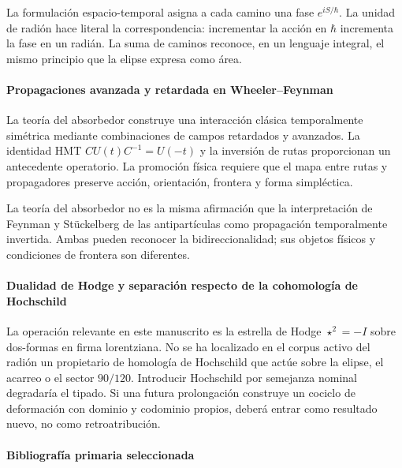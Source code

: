 La formulación espacio-temporal asigna a cada camino una fase
\(e^{iS/\hbar}\). La unidad de radión hace literal la correspondencia:
incrementar la acción en \(\hbar\) incrementa la fase en un radián. La suma de
caminos reconoce, en un lenguaje integral, el mismo principio que la elipse
expresa como área.

\paragraph{Propagaciones avanzada y retardada en Wheeler--Feynman}

La teoría del absorbedor construye una interacción clásica temporalmente
simétrica mediante combinaciones de campos retardados y avanzados. La
identidad HMT \(CU(t)C^{-1}=U(-t)\) y la inversión de rutas proporcionan un
antecedente operatorio. La promoción física requiere que el mapa entre rutas
y propagadores preserve acción, orientación, frontera y forma simpléctica.

La teoría del absorbedor no es la misma afirmación que la interpretación de
Feynman y Stückelberg de las antipartículas como propagación temporalmente
invertida. Ambas pueden reconocer la bidireccionalidad; sus objetos físicos y
condiciones de frontera son diferentes.

\paragraph{Dualidad de Hodge y separación respecto de la cohomología de Hochschild}

La operación relevante en este manuscrito es la estrella de Hodge
\(\star^2=-I\) sobre dos-formas en firma lorentziana. No se ha localizado en
el corpus activo del radión un propietario de homología de Hochschild que
actúe sobre la elipse, el acarreo o el sector \(90/120\). Introducir Hochschild
por semejanza nominal degradaría el tipado. Si una futura prolongación
construye un cociclo de deformación con dominio y codominio propios, deberá
entrar como resultado nuevo, no como retroatribución.

\paragraph{Bibliografía primaria seleccionada}

